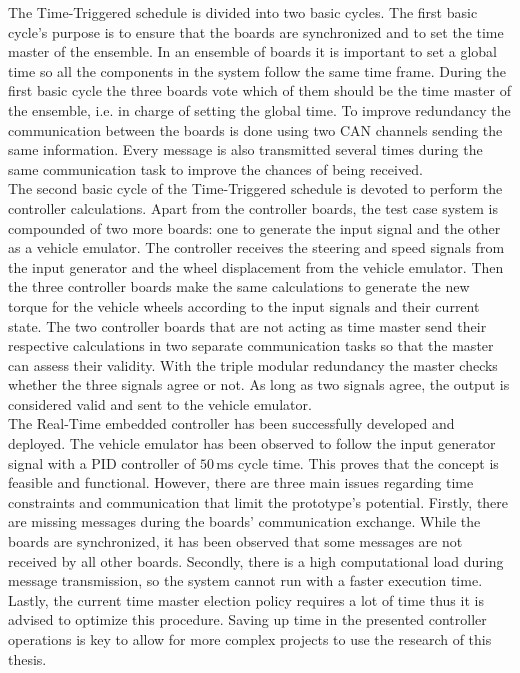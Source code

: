 \documentclass[table,xcdraw]{article}
\begin{document}
The Time-Triggered schedule is divided into two basic cycles. The first basic cycle's purpose is to ensure that the boards are synchronized and to set the time master of the ensemble. In an ensemble of boards it is important to set a global time so all the components in the system follow the same time frame. During the first basic cycle the three boards vote which of them should be the time master of the ensemble, i.e. in charge of setting the global time. To improve redundancy the communication between the boards is done using two CAN channels sending the same information. Every message is also transmitted several times during the same communication task to improve the chances of being received.\\

 The second basic cycle of the Time-Triggered schedule is devoted to perform the controller calculations. Apart from the controller boards, the test case system is compounded of two more boards: one to generate the input signal and the other as a vehicle emulator. The controller receives the steering and speed signals from the input generator and the wheel displacement from the vehicle emulator. Then the three controller boards make the same calculations to generate the new torque for the vehicle wheels according to the input signals and their current state. The two controller boards that are not acting as time master send their respective calculations in two separate communication tasks so that the master can assess their validity. With the triple modular redundancy the master checks whether the three signals agree or not. As long as two signals agree, the output is considered valid and sent to the vehicle emulator.\\

The Real-Time embedded controller has been successfully developed and deployed. The vehicle emulator has been observed to follow the input generator signal with a PID controller of $50\,$ms cycle time. This proves that the concept is feasible and functional. However, there are three main issues regarding time constraints and communication that limit the prototype's potential. Firstly, there are missing messages during the boards' communication exchange. While the boards are synchronized, it has been observed that some messages are not received by all other boards. Secondly, there is a high computational load during message transmission, so the system cannot run with a faster execution time. Lastly, the current time master election policy requires a lot of time thus it is advised to optimize this procedure. Saving up time in the presented controller operations is key to allow for more complex projects to use the research of this thesis.\\
\end{document}
